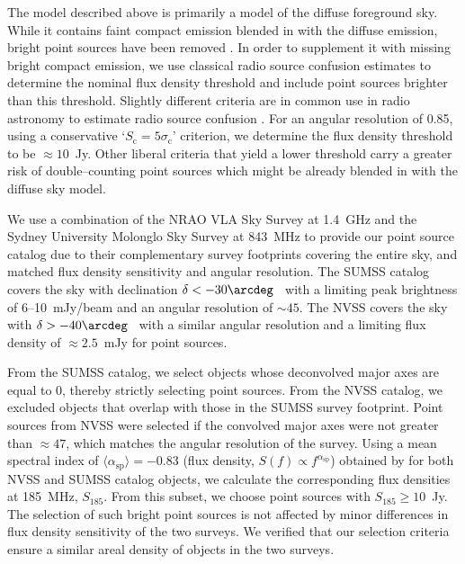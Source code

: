 \documentclass[preprint2,iop,numberedappendix,twocolappendix,appendixfloats]{emulateapj}
\begin{document}
The model described above is primarily a model of the diffuse foreground sky. While it contains faint compact emission blended in with the diffuse emission, bright point sources have been removed \citep{deo08}. In order to supplement it with missing bright compact emission, we use classical radio source confusion estimates to determine the nominal flux density threshold and include point sources brighter than this threshold. Slightly different criteria are in common use in radio astronomy to estimate radio source confusion \citep[see Appendix of][and references therein]{thy13}. For an angular resolution of 0.85\arcdeg, using a conservative `$S_\textrm{c}=5\sigma_\textrm{c}$' criterion, we determine the flux density threshold to be $\approx 10$~Jy. Other liberal criteria that yield a lower threshold carry a greater risk of double--counting point sources which might be already blended in with the diffuse sky model. 

We use a combination of the NRAO VLA Sky Survey \citep[NVSS;][]{con98} at 1.4~GHz and the Sydney University Molonglo Sky Survey \citep[SUMSS;][]{boc99,mau03} at 843~MHz to provide our point source catalog due to their complementary survey footprints covering the entire sky, and matched flux density sensitivity and angular resolution. The SUMSS catalog covers the sky with declination $\delta < -30\arcdeg$~ with a limiting peak brightness of 6--10~mJy/beam and an angular resolution of $\sim 45$\arcsec. The NVSS covers the sky with $\delta > -40\arcdeg$~ with a similar angular resolution and a limiting flux density of $\approx 2.5$~mJy for point sources. 

From the SUMSS catalog, we select objects whose deconvolved major axes are equal to 0\arcsec, thereby strictly selecting point sources. From the NVSS catalog, we excluded objects that overlap with those in the SUMSS survey footprint. Point sources from NVSS were selected if the convolved major axes were not greater than $\approx 47$\arcsec, which matches the angular resolution of the survey. Using a mean spectral index of $\langle\alpha_\textrm{sp}\rangle=-0.83$ (flux density, $S(f)\propto f^{\alpha_\textrm{sp}}$) obtained by \citet{mau03} for both NVSS and SUMSS catalog objects, we calculate the corresponding flux densities at 185~MHz, $S_{185}$. From this subset, we choose point sources with $S_{185}\geq 10$~Jy. The selection of such bright point sources is not affected by minor differences in flux density sensitivity of the two surveys. We verified that our selection criteria ensure a similar areal density of objects in the two surveys. 
\end{document}
